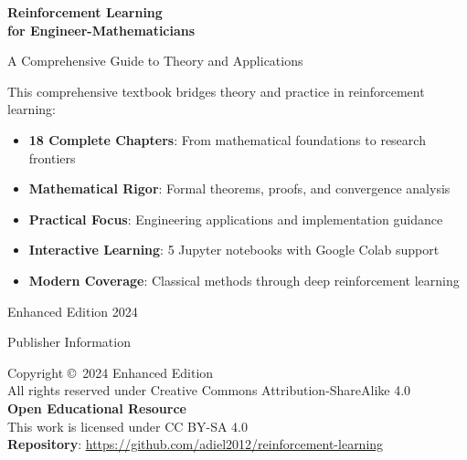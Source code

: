 \documentclass[11pt,twoside,openright]{book}
\begin{document}
\frontmatter

\begin{titlepage}
    \centering
    \vspace*{2cm}
    
    {\Huge\bfseries Reinforcement Learning\\for Engineer-Mathematicians\par}
    \vspace{1.5cm}
    {\Large A Comprehensive Guide to Theory and Applications\par}
    \vspace{2cm}
    
    \begin{tcolorbox}[colback=blue!5,colframe=blue!40!black,title=About This Enhanced Edition]
    This comprehensive textbook bridges theory and practice in reinforcement learning:
    \begin{itemize}
        \item \textbf{18 Complete Chapters}: From mathematical foundations to research frontiers
        \item \textbf{Mathematical Rigor}: Formal theorems, proofs, and convergence analysis
        \item \textbf{Practical Focus}: Engineering applications and implementation guidance  
        \item \textbf{Interactive Learning}: 5 Jupyter notebooks with Google Colab support
        \item \textbf{Modern Coverage}: Classical methods through deep reinforcement learning
    \end{itemize}
    \end{tcolorbox}
    
    \vspace{2cm}
    {\large Enhanced Edition 2024\par}
    \vfill
    
    {\large Publisher Information\par}
\end{titlepage}

\newpage
\thispagestyle{empty}
\vspace*{\fill}
\begin{center}
Copyright \copyright\ 2024 Enhanced Edition\\
All rights reserved under Creative Commons Attribution-ShareAlike 4.0\\[1em]
\textbf{Open Educational Resource}\\
This work is licensed under CC BY-SA 4.0\\[1em]
\textbf{Repository}: \url{https://github.com/adiel2012/reinforcement-learning}
\end{center}
\vspace*{\fill}
\end{document}

